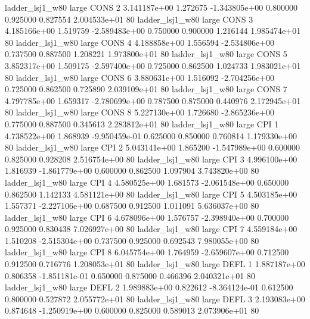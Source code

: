     ladder_lsj1_w80      large     CONS                 2 3.141187e+00      1.272675 -1.343805e+00 0.800000 0.925000       0.827554 2.004533e+01 80
    ladder_lsj1_w80      large     CONS                 3 4.185166e+00      1.519759 -2.589483e+00 0.750000 0.900000       1.216144 1.985474e+01 80
    ladder_lsj1_w80      large     CONS                 4 4.188858e+00      1.556594 -2.534806e+00 0.737500 0.887500       1.208221 1.973800e+01 80
    ladder_lsj1_w80      large     CONS                 5 3.852317e+00      1.509175 -2.597400e+00 0.725000 0.862500       1.024733 1.983021e+01 80
    ladder_lsj1_w80      large     CONS                 6 3.880631e+00      1.516092 -2.704256e+00 0.725000 0.862500       0.725890 2.039109e+01 80
    ladder_lsj1_w80      large     CONS                 7 4.797785e+00      1.659317 -2.780699e+00 0.787500 0.875000       0.440976 2.172945e+01 80
    ladder_lsj1_w80      large     CONS                 8 5.227130e+00      1.726680 -2.865236e+00 0.775000 0.887500       0.345613 2.283812e+01 80
    ladder_lsj1_w80      large      CPI                 1 4.738522e+00      1.868939 -9.950459e-01 0.625000 0.850000       0.760814 1.179330e+00 80
    ladder_lsj1_w80      large      CPI                 2 5.043141e+00      1.865200 -1.547989e+00 0.600000 0.825000       0.928208 2.516754e+00 80
    ladder_lsj1_w80      large      CPI                 3 4.996100e+00      1.816939 -1.861779e+00 0.600000 0.862500       1.097904 3.743820e+00 80
    ladder_lsj1_w80      large      CPI                 4 4.580525e+00      1.681573 -2.061548e+00 0.650000 0.862500       1.142133 4.581121e+00 80
    ladder_lsj1_w80      large      CPI                 5 4.503185e+00      1.557371 -2.227106e+00 0.687500 0.912500       1.011091 5.636037e+00 80
    ladder_lsj1_w80      large      CPI                 6 4.678096e+00      1.576757 -2.398940e+00 0.700000 0.925000       0.830438 7.026927e+00 80
    ladder_lsj1_w80      large      CPI                 7 4.559184e+00      1.510208 -2.515304e+00 0.737500 0.925000       0.692543 7.980055e+00 80
    ladder_lsj1_w80      large      CPI                 8 6.045754e+00      1.764959 -2.659607e+00 0.712500 0.912500       0.716776 1.208053e+01 80
    ladder_lsj1_w80      large     DEFL                 1 1.887187e+00      0.806358 -1.851181e-01 0.650000 0.875000       0.466396 2.040321e+01 80
    ladder_lsj1_w80      large     DEFL                 2 1.989883e+00      0.822612 -8.364124e-01 0.612500 0.800000       0.527872 2.055772e+01 80
    ladder_lsj1_w80      large     DEFL                 3 2.193083e+00      0.874648 -1.250919e+00 0.600000 0.825000       0.589013 2.073906e+01 80

